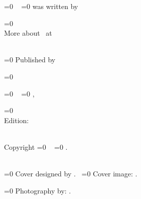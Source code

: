 \begin{footnotesize}

\parindent 0pt

\begin{center}
\ifnum\pdfstrcmp{\varTitle}{}=0 \else \textit{\varTitle}\ \fi 
\ifnum\pdfstrcmp{\varAuthors}{}=0 \else was written by \varAuthors \fi

\ifnum\pdfstrcmp{\varURLAuthor}{}=0 ~\\ %
\else 
More about \varAuthors \ at \varURLAuthor\ \\~\\ %
\fi 

\ifnum\pdfstrcmp{\varPublisher}{}=0 \else Published by \varPublisher \fi  

\ifnum\pdfstrcmp{\varURLPublisher}{}=0 \else  \varURLPublisher \fi

\ifnum\pdfstrcmp{\varPublishercity}{}=0 \else \ \varPublishercity \fi
\ifnum\pdfstrcmp{\varPublicationdate}{}=0 \else ,  \varPublicationdate \fi

\ifnum\pdfstrcmp{\varEdition}{}=0 ~\\ %
\else 
Edition: \varEdition\ \\~\\ %
\fi 

Copyright \textcopyright{} %
\ifnum\pdfstrcmp{\varCopyrightdate}{}=0 \else \varCopyrightdate\ \fi 
\ifnum\pdfstrcmp{\varCopyrightholder}{}=0 \else \varCopyrightholder 
.\\~\\ \fi

\ifnum\pdfstrcmp{\varCoverdesign}{}=0 \else Cover designed by \varCoverdesign .\ \fi 
\ifnum\pdfstrcmp{\varCoverimage}{}=0 \else Cover image: \varCoverimage .\ \fi

\ifnum\pdfstrcmp{\varPhotographyby}{}=0 \else Photography by: \varPhotographyby .\ \fi


\end{center}
\end{footnotesize}
